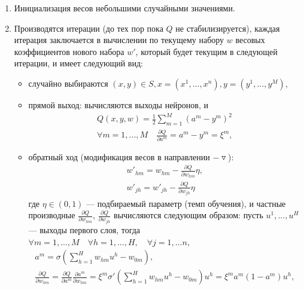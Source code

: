 \begin{enumerate}
    \item Инициализация весов небольшими случайными значениями.
    \item Производятся итерации (до тех пор пока $Q$ не стабилизируется), каждая итерация заключается в вычислении по текущему набору $w$ весовых коэффициентов нового набора $w'$, который будет текущим в следующей итерации, и имеет следующий вид:
    \begin{itemize}
        \item случайно выбираются $(x,y) \in S, x = (x^1,...,x^n),y = (y^1,...,y^M)$,
        \item прямой выход: вычисляются выходы нейронов, и 
        \begin{equation}
            \begin{aligned}
                Q(x, y, w) = \frac{1}{2}\sum_{m=1}^{M}(a^m-y^m)^2\\
                \forall m = 1,...,M \quad \frac{\partial Q}{\partial a^m} = a^m - y^m = \xi^m,    
            \end{aligned}
            \label{eq:nn31}
        \end{equation}
        \item обратный ход (модификация весов в направлении $-\triangledown$):
        \begin{equation}
            \begin{aligned}                
                w'_{hm} = w_{hm} - \frac{\partial Q}{\partial w_{hm}}\eta,\\
                w'_{jh} = w'_{jh} - \frac{\partial Q}{\partial w_{jh}}\eta
            \end{aligned}
            \label{eq:nn32}
        \end{equation}
        где $\eta \in (0, 1)$ --- подбираемый параметр (темп обучения), и частные производные $\frac{\partial Q}{\partial w_{hm}}$, $\frac{\partial Q}{\partial w_{jh}}$ вычисляются следующим образом:
        пусть $u^1,...,u^H$ --- выходы первого слоя, тогда $\forall m = 1,...,M \quad \forall h = 1,...,H, \quad \forall j = 1,...n,$
            \begin{gather*}                
                a^m = \sigma(\sum_{h=1}^{H}w_{hm}u^h-w_{0m}),\\
                \frac{\partial Q}{\partial w_{hm}} = \frac{\partial Q}{\partial a^m}\frac{\partial a^m}{\partial w_{hm}} = \xi^m \sigma'(\sum_{h=1}^{H}w_{hm}u^h - w_{0m})u^h= \xi^m a^m (1 - a^m) u^h,\\

\end{gather*}
\end{itemize}
\end{enumerate}
